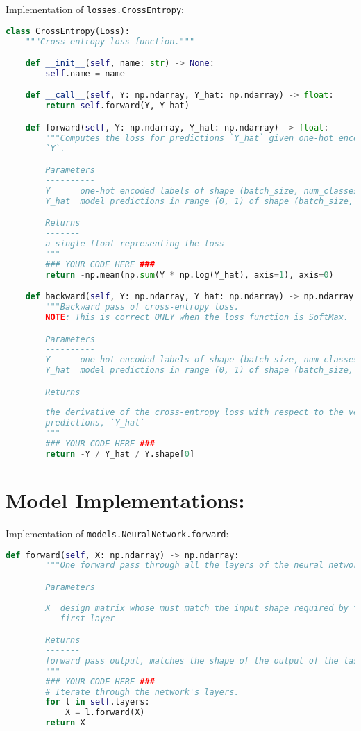 Implementation of \texttt{losses.CrossEntropy}:

\begin{lstlisting}[language=Python]
class CrossEntropy(Loss):
    """Cross entropy loss function."""

    def __init__(self, name: str) -> None:
        self.name = name

    def __call__(self, Y: np.ndarray, Y_hat: np.ndarray) -> float:
        return self.forward(Y, Y_hat)

    def forward(self, Y: np.ndarray, Y_hat: np.ndarray) -> float:
        """Computes the loss for predictions `Y_hat` given one-hot encoded labels
        `Y`.

        Parameters
        ----------
        Y      one-hot encoded labels of shape (batch_size, num_classes)
        Y_hat  model predictions in range (0, 1) of shape (batch_size, num_classes)

        Returns
        -------
        a single float representing the loss
        """
        ### YOUR CODE HERE ###
        return -np.mean(np.sum(Y * np.log(Y_hat), axis=1), axis=0)

    def backward(self, Y: np.ndarray, Y_hat: np.ndarray) -> np.ndarray:
        """Backward pass of cross-entropy loss.
        NOTE: This is correct ONLY when the loss function is SoftMax.

        Parameters
        ----------
        Y      one-hot encoded labels of shape (batch_size, num_classes)
        Y_hat  model predictions in range (0, 1) of shape (batch_size, num_classes)

        Returns
        -------
        the derivative of the cross-entropy loss with respect to the vector of
        predictions, `Y_hat`
        """
        ### YOUR CODE HERE ###
        return -Y / Y_hat / Y.shape[0]

\end{lstlisting}


\section{Model Implementations:}

Implementation of \texttt{models.NeuralNetwork.forward}:

\begin{lstlisting}[language=Python]
    def forward(self, X: np.ndarray) -> np.ndarray:
        """One forward pass through all the layers of the neural network.

        Parameters
        ----------
        X  design matrix whose must match the input shape required by the
           first layer

        Returns
        -------
        forward pass output, matches the shape of the output of the last layer
        """
        ### YOUR CODE HERE ###
        # Iterate through the network's layers.
        for l in self.layers:
            X = l.forward(X)
        return X

\end{lstlisting}

